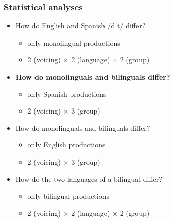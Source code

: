 \documentclass{beamer}
\begin{document}
\begin{frame}
\frametitle{Statistical analyses}
\begin{itemize}
	\item How do English and Spanish /d t/ differ?
	\begin{itemize}
		\item only monolingual productions
		\item 2 (voicing) $\times$ 2 (language) $\times$ 2 (group)
	\end{itemize}
	\item \textbf{How do monolinguals and bilinguals differ?}
	\begin{itemize}
		\item only Spanish productions
		\item 2 (voicing) $\times$ 3 (group)
	\end{itemize}
	\item How do monolinguals and bilinguals differ?
	\begin{itemize}
		\item only English productions
		\item 2 (voicing) $\times$ 3 (group)
	\end{itemize}
	\item How do the two languages of a bilingual differ?
	\begin{itemize}
		\item only bilingual productions
		\item 2 (voicing) $\times$ 2 (language) $\times$ 2 (group)
	\end{itemize}
\end{itemize}
\end{frame}
\end{document}
